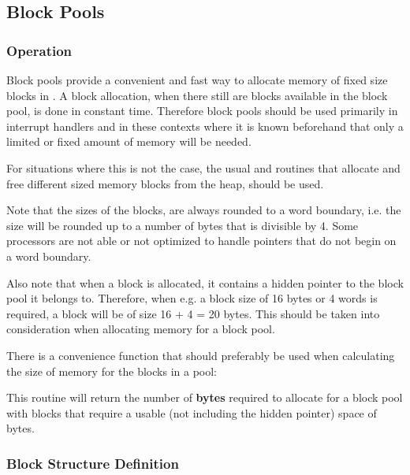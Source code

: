 %
%

\subsection{Block Pools}

\subsubsection{Operation}

Block pools provide a convenient and fast way to allocate memory of fixed
size blocks in \oswald. A block allocation, when there still are blocks
available in the block pool, is done in constant time. Therefore block pools
should be used primarily in interrupt handlers and in these contexts where
it is known beforehand that only a limited or fixed amount of memory will be needed. 

For situations where this is not the case, the usual 
and  routines that allocate and free different sized
memory blocks from the heap, should be used.

Note that the sizes of the blocks, are always rounded to a word boundary,
i.e. the size will be rounded up to a number of bytes that is divisible by 4.
Some processors are not able or not optimized to handle pointers that do not
begin on a word boundary.

Also note that when a block is allocated, it contains a hidden pointer to
the block pool it belongs to. Therefore, when e.g. a block size of 16 bytes
or 4 words is required, a block will be of size 16 + 4 = 20 bytes. This
should be taken into consideration when allocating memory for a block pool.

There is a convenience function that should preferably be used when
calculating the size of memory for the blocks in a pool:


This routine will return the number of \textbf{bytes} required to allocate
for a block pool with  blocks that require a usable (not
including the hidden pointer) space of  bytes.

\subsubsection{Block Structure Definition}

